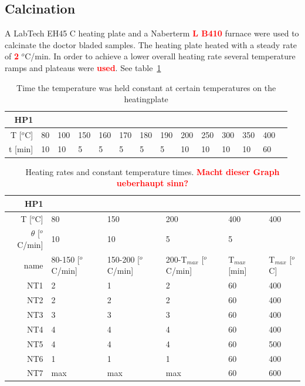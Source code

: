 \documentclass[a4paper]{article}
\newcommand{\todo}[1]{\textbf{\textcolor{red}{#1}}}
\newcommand{\td}[1]{\textbf{\textcolor{red}{#1}}}
\newcommand{\oc}{$^o$C}
\begin{document}
\subsection{Calcination}
A LabTech EH45 C heating plate and a Naberterm \td{L B410} furnace were used to calcinate the doctor bladed samples. 
The heating plate heated with a steady rate of \td{2} $^o$C/min. 
In order to achieve a lower overall heating rate several temperature ramps and plateaus were \todo{used}. See table~\ref{tab:labtech}


\begin{table}[h]
	\centering
	\begin{tabular}{rl ll ll ll ll ll ll }%
		HP1		&&&&&&&&&&&&&\\
		\hline
		T [\oc]	&80		&100	&150	&160	&170 	&180	&190	&200	&250	&300	&350	&400	\\
		t [min]	&10 	&10		&5 		&5 		&5 		&5 &5 &10 &10 &10 &10 &60 \\
		\hline
	\end{tabular}
	\caption{Time the temperature was held constant at certain temperatures on the heatingplate}
	\label{tab:labtech}
\end{table}


\begin{table}[h]
	\centering
	\begin{tabular}{rl ll ll}%
		HP1		&&&&&\\%
		\hline
		T [\oc]				&80		&150	&200	&400	&400 	\\
		$\theta$ [\oc/min]	&10 	&10		&5 		&5		& 		\\
		\hline
		name	&80-150 [\oc/min]	&150-200 [\oc/min]	&200-T$_{max}$ [\oc/min]	&T$_{max}$ [min]	&T$_{max}$ [\oc] \\
		NT1		&2					&1					&2					&60 &400 \\
		NT2		&2					&2					&2					&60 &400 \\
		NT3		&3					&3					&3					&60 &400 \\
		NT4		&4					&4					&4					&60 &400 \\
		NT5		&4					&4					&4					&60 &500 \\
		NT6		&1					&1					&1					&60 &400 \\
		NT7		&max				&max				&max				&60 &600 \\
		\hline
	\end{tabular}
	\caption{Heating rates and constant temperature times. \td{Macht dieser Graph ueberhaupt sinn? }}
	\label{tab:nt}
\end{table}
\end{document}
